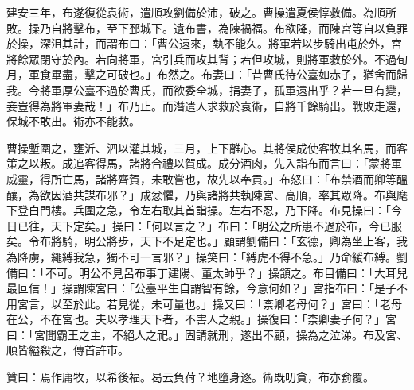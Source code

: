 \begin{pinyinscope}
建安三年，布遂復從袁術，遣順攻劉備於沛，破之。曹操遣夏侯惇救備。為順所敗。操乃自將擊布，至下邳城下。遺布書，為陳禍福。布欲降，而陳宮等自以負罪於操，深沮其計，而謂布曰：「曹公遠來，埶不能久。將軍若以步騎出屯於外，宮將餘眾閉守於內。若向將軍，宮引兵而攻其背；若但攻城，則將軍救於外。不過旬月，軍食畢盡，擊之可破也。」布然之。布妻曰：「昔曹氏待公臺如赤子，猶舍而歸我。今將軍厚公臺不過於曹氏，而欲委全城，捐妻子，孤軍遠出乎？若一旦有變，妾豈得為將軍妻哉！」布乃止。而潛遣人求救於袁術，自將千餘騎出。戰敗走還，保城不敢出。術亦不能救。

曹操塹圍之，壅沂、泗以灌其城，三月，上下離心。其將侯成使客牧其名馬，而客策之以叛。成追客得馬，諸將合禮以賀成。成分酒肉，先入詣布而言曰：「蒙將軍威靈，得所亡馬，諸將齊賀，未敢嘗也，故先以奉貢。」布怒曰：「布禁酒而卿等醞釀，為欲因酒共謀布邪？」成忿懼，乃與諸將共執陳宮、高順，率其眾降。布與麾下登白門樓。兵圍之急，令左右取其首詣操。左右不忍，乃下降。布見操曰：「今日已往，天下定矣。」操曰：「何以言之？」布曰：「明公之所患不過於布，今已服矣。令布將騎，明公將步，天下不足定也。」顧謂劉備曰：「玄德，卿為坐上客，我為降虜，繩縛我急，獨不可一言邪？」操笑曰：「縛虎不得不急。」乃命緩布縛。劉備曰：「不可。明公不見呂布事丁建陽、董太師乎？」操頷之。布目備曰：「大耳兒最叵信！」操謂陳宮曰：「公臺平生自謂智有餘，今意何如？」宮指布曰：「是子不用宮言，以至於此。若見從，未可量也。」操又曰：「柰卿老母何？」宮曰：「老母在公，不在宮也。夫以孝理天下者，不害人之親。」操復曰：「柰卿妻子何？」宮曰：「宮聞霸王之主，不絕人之祀。」固請就刑，遂出不顧，操為之泣涕。布及宮、順皆縊殺之，傳首許市。

贊曰：焉作庸牧，以希後福。曷云負荷？地墮身逐。術既叨貪，布亦侴覆。


\end{pinyinscope}
